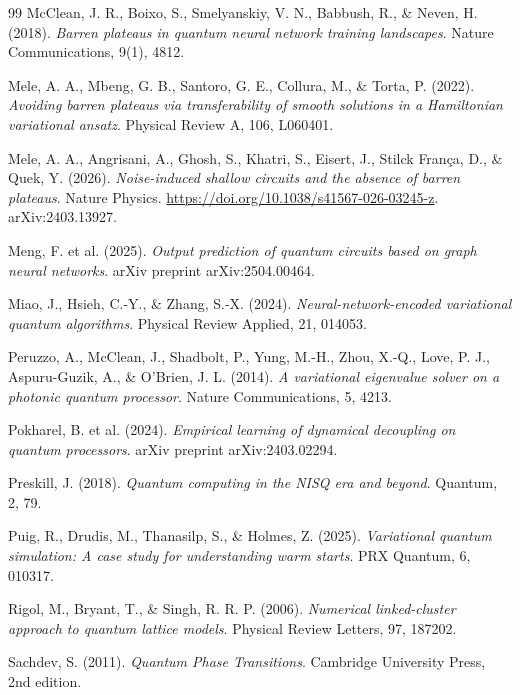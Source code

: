 \documentclass[11pt,a4paper,spanish]{book}
\begin{document}
\begin{thebibliography}{99}
 McClean, J. R., Boixo, S., Smelyanskiy, V. N., Babbush, R., \& Neven, H. (2018). \emph{Barren plateaus in quantum neural network training landscapes}. Nature Communications, 9(1), 4812.

 Mele, A. A., Mbeng, G. B., Santoro, G. E., Collura, M., \& Torta, P. (2022). \emph{Avoiding barren plateaus via transferability of smooth solutions in a Hamiltonian variational ansatz}. Physical Review A, 106, L060401.

 Mele, A. A., Angrisani, A., Ghosh, S., Khatri, S., Eisert, J., Stilck Fran\c{c}a, D., \& Quek, Y. (2026). \emph{Noise-induced shallow circuits and the absence of barren plateaus}. Nature Physics. \url{https://doi.org/10.1038/s41567-026-03245-z}. arXiv:2403.13927.

 Meng, F. et al. (2025). \emph{Output prediction of quantum circuits based on graph neural networks}. arXiv preprint arXiv:2504.00464.

 Miao, J., Hsieh, C.-Y., \& Zhang, S.-X. (2024). \emph{Neural-network-encoded variational quantum algorithms}. Physical Review Applied, 21, 014053.

 Peruzzo, A., McClean, J., Shadbolt, P., Yung, M.-H., Zhou, X.-Q., Love, P. J., Aspuru-Guzik, A., \& O'Brien, J. L. (2014). \emph{A variational eigenvalue solver on a photonic quantum processor}. Nature Communications, 5, 4213.

 Pokharel, B. et al. (2024). \emph{Empirical learning of dynamical decoupling on quantum processors}. arXiv preprint arXiv:2403.02294.

 Preskill, J. (2018). \emph{Quantum computing in the NISQ era and beyond}. Quantum, 2, 79.

 Puig, R., Drudis, M., Thanasilp, S., \& Holmes, Z. (2025). \emph{Variational quantum simulation: A case study for understanding warm starts}. PRX Quantum, 6, 010317.

 Rigol, M., Bryant, T., \& Singh, R. R. P. (2006). \emph{Numerical linked-cluster approach to quantum lattice models}. Physical Review Letters, 97, 187202.

 Sachdev, S. (2011). \emph{Quantum Phase Transitions}. Cambridge University Press, 2nd edition.


\end{thebibliography}
\end{document}
